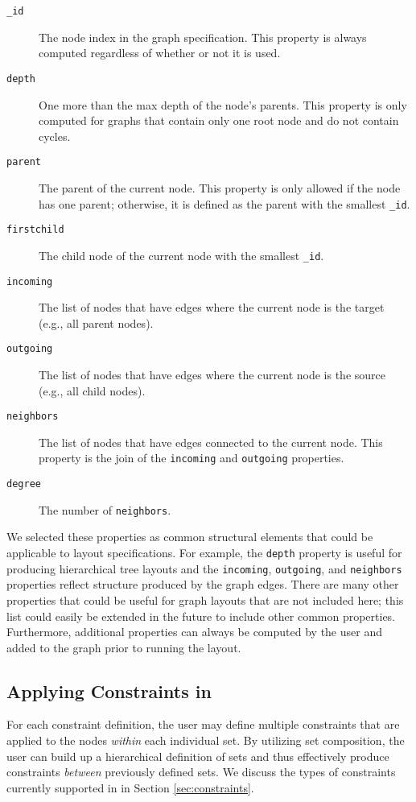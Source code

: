 \begin{description}
\item[\texttt{\_id}] The node index in the graph specification. This
  property is always computed regardless of whether or not it is used.
\item[\texttt{depth}] One more than the max depth of the node's
  parents. This property is only computed for graphs that contain only one
  root node and do not contain cycles. 
\item[\texttt{parent}] The parent of the current node. This property is
  only allowed if the node has one parent; otherwise, it is defined as the
  parent with the smallest \texttt{\_id}.
\item[\texttt{firstchild}] The child node of the current node with the smallest \texttt{\_id}.
\item[\texttt{incoming}] The list of nodes that have edges where the
  current node is the target (e.g., all parent nodes).
\item[\texttt{outgoing}] The list of nodes that have edges where the
  current node is the source (e.g., all child nodes).
\item[\texttt{neighbors}] The list of nodes that have edges connected to
  the current node. This property is the join of the \texttt{incoming} and
  \texttt{outgoing} properties.
\item[\texttt{degree}] The number of \texttt{neighbors}.
\end{description}


We selected these properties as common structural elements that could be
applicable to layout specifications. For example, the \texttt{depth}
property is useful for producing hierarchical tree layouts and the 
\texttt{incoming}, \texttt{outgoing}, and \texttt{neighbors} properties
reflect structure produced by the graph edges. There are many other
properties that could be useful for graph layouts that are not included 
here; this list could easily be extended in the future to include other
common properties. Furthermore, additional properties can always be
computed by the user and added to the graph prior to running the layout.

\subsection{Applying Constraints in \projectname}
For each constraint definition, the user may define multiple constraints
that are applied to the nodes \emph{within} each individual set. 
By utilizing set composition, the user can build up a hierarchical 
definition of sets and thus effectively produce constraints \emph{between} 
previously defined sets. We discuss the types of constraints currently 
supported in \projectname in Section \ref{sec:constraints}.